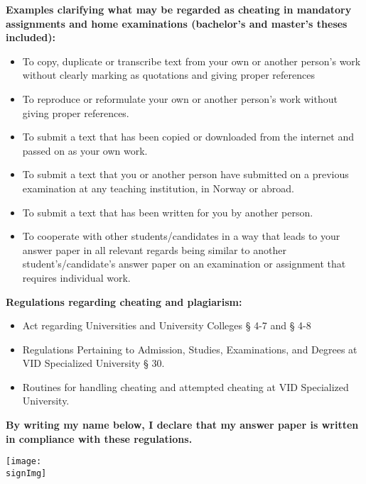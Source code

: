 \begin{scriptsize}

\noindent
\textbf{Examples clarifying what may be regarded as cheating in mandatory
assignments and home examinations (bachelor's and master's theses
included):}
\begin{itemize}[leftmargin=0.5cm]
\item To copy, duplicate or transcribe text from your own or another person's
	work without clearly marking as quotations and giving proper references
\item To reproduce or reformulate your own or another person's work without
	giving proper references.
\item To submit a text that has been copied or downloaded from the internet and
	passed on as your own work.
\item To submit a text that you or another person have submitted on a previous
	examination at any teaching institution, in Norway or abroad.
\item To submit a text that has been written for you by another person.
\item To cooperate with other students/candidates in a way that leads to your
	answer paper in all relevant regards being similar to another
	student's/candidate's answer paper on an examination or assignment that
	requires individual work.
\end{itemize}

\noindent
\textbf{Regulations regarding cheating and plagiarism:}
\begin{itemize}[leftmargin=0.5cm]
\item Act regarding Universities and University Colleges § 4-7 and § 4-8
\item Regulations Pertaining to Admission, Studies, Examinations, and Degrees at
	VID Specialized University § 30.
\item Routines for handling cheating and attempted cheating at VID Specialized
	University.
\end{itemize}

\noindent
\textbf{By writing my name below, I declare that my answer paper is written in
compliance with these regulations.}
\end{scriptsize}

\begin{center}
	\vspace*{\fill}
	\texttt{[image: \\signImg]}
	\vspace*{\fill}
\end{center}
